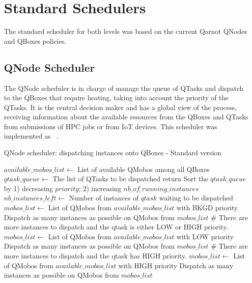 \section{Standard Schedulers}

The standard scheduler for both levels was based on the current Qarnot QNodes and QBoxes policies.

\subsection{QNode Scheduler}

The QNode scheduler is in charge of manage the queue of QTasks and dispatch to the QBoxes that require heating, taking into account the priority of the QTasks.
It is the central decision maker and has a global view of the process, receiving information about the available resources from the QBoxes and QTasks from submissions of HPC jobs or from IoT devices. This scheduler was implemented as ~.

\begin{algorithm} %
    \caption{QNode scheduler: dispatching instances onto QBoxes - Standard version}
    \label{alg:StandardSched}
        \begin{algorithmic}[1]
            \STATE $available\_mobos\_list \leftarrow$ List of available QMobos among all QBoxes
            \STATE $qtask\_queue \leftarrow$ The list of QTasks to be dispatched
                \STATE return
            \ELSE
                \STATE Sort the $qtask\_queue$ by 1) decreasing $priority$; 2) increasing $nb\_of\_running\_instances$
                	\STATE $nb\_instances\_left \leftarrow$ Number of instances of $qtask$ waiting to be dispatched
                        \STATE $mobos\_list \leftarrow$ List of QMobos from $available\_mobos\_list$ with BKGD priority
                        \STATE Dispatch as many instances as possible on QMobos from $mobos\_list$
                            \STATE \# There are more instances to dispatch and the qtask is either LOW or HIGH priority.
                            \STATE $mobos\_list \leftarrow$ List of QMobos from $available\_mobos\_list$ with LOW priority
                            \STATE Dispatch as many instances as possible on QMobos from $mobos\_list$
                                \STATE \# There are more instances to dispatch and the qtask has HIGH priority.
                                \STATE $mobos\_list \leftarrow$ List of QMobos from $available\_mobos\_list$ with HIGH priority
                                \STATE Dispatch as many instances as possible on QMobos from $mobos\_list$
                            \ENDIF
                        \ENDIF
                    \ENDIF
                \ENDFOR
            \ENDIF
        \end{algorithmic}
\end{algorithm}

